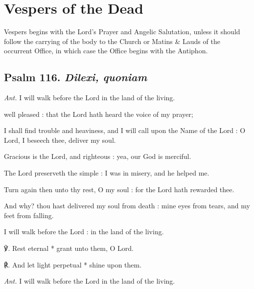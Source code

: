 \section{Vespers of the Dead}
\begin{secrubric}
Vespers begins with the Lord's Prayer and Angelic Salutation, unless it should follow the carrying of the body to the Church or Matins \& Lauds of the occurrent Office, in which case the Office begins with the Antiphon.
\end{secrubric}

\vspace{-0.25\baselineskip}

\subsection{Psalm 116. \textit{Dilexi, quoniam}}\par\noindent
\textit{Ant.} I will walk {\dag} before the Lord in the land of the living.\par
{} well pleased : that the Lord hath heard the voice of my prayer;\par
{}
I shall find trouble and heaviness, and I will call upon the Name of the Lord : O Lord, I beseech thee, deliver my soul.\par
{}Gracious is the Lord, and righteous : yea, our God is merciful.\par
{}The Lord preserveth the simple : I was in misery, and he helped me.\par
{}Turn again then unto thy rest, O my soul : for the Lord hath rewarded thee.\par
{}And why? thou hast delivered my soul from death : mine eyes from tears, and my feet from falling.\par
{}I will walk before the Lord : in the land of the living.
\par
℣. Rest eternal * grant unto them, O Lord.\par
℟. And let light perpetual * shine upon them.\par\noindent
\textit{Ant.} I will walk before the Lord in the land of the living.
